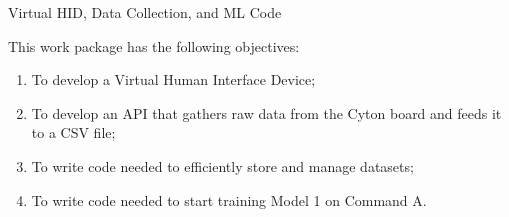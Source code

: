 
\begin{workpackage}{Virtual HID, Data Collection, and ML Code}
  \label{wp:data} %



  \makewptable %
    
  \begin{wpobjectives}
    This work package has the following objectives:
    \begin{enumerate}
    \item To develop a Virtual Human Interface Device;
    \item To develop an  API that gathers raw data from the Cyton board and feeds it 
to a CSV file;
    \item To write code needed to efficiently store and manage datasets;
    \item To write code needed to start training Model 1 on Command A.
    \end{enumerate}
  \end{wpobjectives}
  
  \begin{wpdescription}
 


\end{wpdescription}
\end{workpackage}
